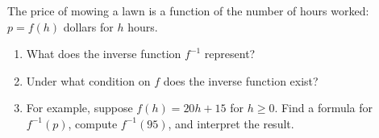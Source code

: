 The price of mowing a lawn is a function of the number of hours worked: $p=f(h)$ dollars for $h$ hours.
\begin{enumerate}
\item[(a)] What does the inverse function $f^{-1}$ represent?
\item[(b)] Under what condition on $f$ does the inverse function exist?
\item[(c)] For example, suppose $f(h)=20h+15$ for $h\ge0$. Find a formula for $f^{-1}(p)$, compute $f^{-1}(95)$, and interpret the result.
\end{enumerate}
